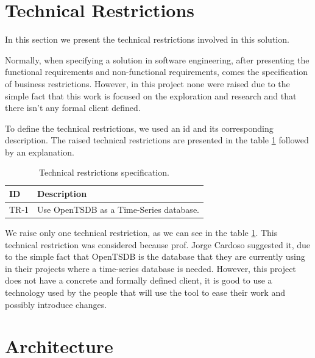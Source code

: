 \section{Technical Restrictions}
\label{sec:technical_restrictions}

In this section we present the technical restrictions involved in this solution.

Normally, when specifying a solution in software engineering, after presenting the functional requirements and non-functional requirements, comes the specification of business restrictions. However, in this project none were raised due to the simple fact that this work is focused on the exploration and research and that there isn't any formal client defined. 

To define the technical restrictions, we used an id and its corresponding description. The raised technical restrictions are presented in the table \ref{table:technical_restrictions_specification} followed by an explanation.

\begin{table}[!ht]
\caption{Technical restrictions specification.}
\label{table:technical_restrictions_specification}
\begin{tabularx}{\linewidth} {
    |>{\hsize=0.4\hsize}X| 
     >{\hsize=1.6\hsize}X| }
    \hline
    \textbf{ID} 
    & \textbf{Description} \\ \hline
    TR-1
    & Use OpenTSDB as a Time-Series database. \\ \hline
\end{tabularx}
\end{table}

We raise only one technical restriction, as we can see in the table \ref{table:technical_restrictions_specification}. This technical restriction was considered because prof. Jorge Cardoso suggested it, due to the simple fact that OpenTSDB is the database that they are currently using in their projects where a time-series database is needed. However, this project does not have a concrete and formally defined client, it is good to use a technology used by the people that will use the tool to ease their work and possibly introduce changes.


\section{Architecture}
\label{sec:architecture}

